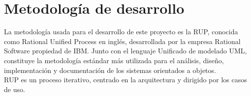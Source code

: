 

\section{Metodología de desarrollo}
La metodología usada para el desarrollo de este proyecto es la RUP, conocida como Rational Unified Process en inglés, desarrollada por la empresa
Rational Software propiedad de IBM. Junto con el lenguaje Unificado de modelado UML, constituye la metodología estándar más utilizada para
el análisis, diseño, implementación y documentación de los sistemas orientados a objetos.\\
RUP es un proceso iterativo, centrado en la arquitectura y dirigido por los casos de uso.

